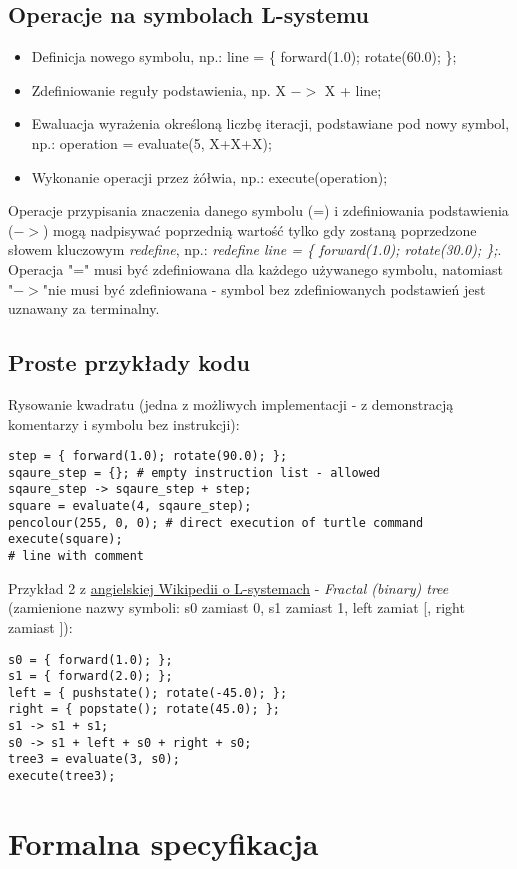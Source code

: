 \documentclass{article}
\begin{document}
\subsection{Operacje na symbolach L-systemu}
\begin{itemize}
    \item{Definicja nowego symbolu, np.: line = \{ forward(1.0); rotate(60.0); \};}
    \item{Zdefiniowanie reguły podstawienia, np. X $-$$>$ X + line;}
    \item{Ewaluacja wyrażenia określoną liczbę iteracji, podstawiane pod nowy symbol, np.: operation = evaluate(5, X+X+X);}
    \item{Wykonanie operacji przez żółwia, np.: execute(operation);}
\end{itemize}
Operacje przypisania znaczenia danego symbolu (=) i zdefiniowania podstawienia ($-$$>$) mogą nadpisywać poprzednią wartość tylko gdy zostaną poprzedzone słowem kluczowym \textit{redefine}, np.: \textit{redefine line = \{ forward(1.0); rotate(30.0); \};}. Operacja "=" musi być zdefiniowana dla każdego używanego symbolu, natomiast "$-$$>$"nie musi być zdefiniowana - symbol bez zdefiniowanych podstawień jest uznawany za terminalny. 

\subsection{Proste przykłady kodu}
Rysowanie kwadratu (jedna z możliwych implementacji - z demonstracją komentarzy i symbolu bez instrukcji):
\begin{lstlisting}
step = { forward(1.0); rotate(90.0); };
sqaure_step = {}; # empty instruction list - allowed
sqaure_step -> sqaure_step + step;
square = evaluate(4, sqaure_step);
pencolour(255, 0, 0); # direct execution of turtle command
execute(square);
# line with comment
\end{lstlisting}
Przykład 2 z \href{https://en.wikipedia.org/wiki/L-system}{angielskiej Wikipedii o L-systemach} - \textit{Fractal (binary) tree}
(zamienione nazwy symboli: s0 zamiast 0, s1 zamiast 1, left zamiat [, right zamiast ]): 
\begin{lstlisting}
s0 = { forward(1.0); };
s1 = { forward(2.0); };
left = { pushstate(); rotate(-45.0); };
right = { popstate(); rotate(45.0); };
s1 -> s1 + s1;
s0 -> s1 + left + s0 + right + s0;
tree3 = evaluate(3, s0);
execute(tree3);
\end{lstlisting}


\section{Formalna specyfikacja}
\end{document}
